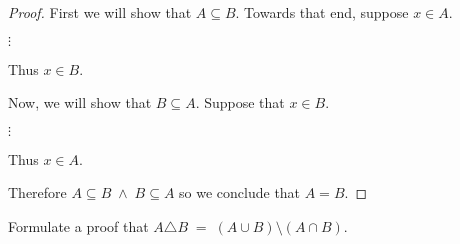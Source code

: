 \begin{enumerate}
\begin{proof} 
First we will show that $A \subseteq B$.\newline
Towards that end, suppose $x \in A$.

\begin{center}
$\vdots$
\end{center}

Thus $x \in B$.

Now, we will show that $B \subseteq A$. \newline
Suppose that $x \in B$.

\begin{center}
$\vdots$
\end{center}

Thus $x \in A$.

Therefore $A \subseteq B \; \land \; B \subseteq A$ so we conclude that $A=B$.
\end{proof}

Formulate a proof that $A \triangle B \; = \; (A \cup B) \setminus (A \cap B)$.


\wbvfill

\workbookpagebreak

\end{enumerate}



